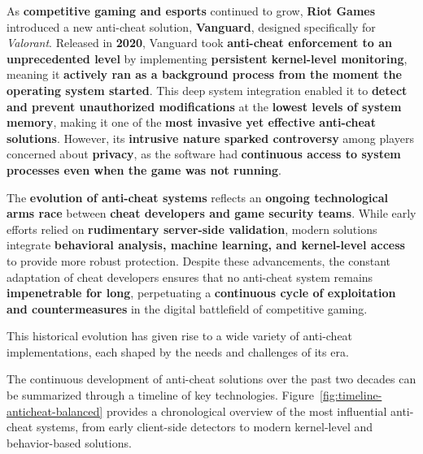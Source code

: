 As \textbf{competitive gaming and esports} continued to grow, \textbf{Riot Games} introduced a new anti-cheat solution, \textbf{Vanguard}, designed specifically for \textit{Valorant}. Released in \textbf{2020}, Vanguard took \textbf{anti-cheat enforcement to an unprecedented level} by implementing \textbf{persistent kernel-level monitoring}, meaning it \textbf{actively ran as a background process from the moment the operating system started}. This deep system integration enabled it to \textbf{detect and prevent unauthorized modifications} at the \textbf{lowest levels of system memory}, making it one of the \textbf{most invasive yet effective anti-cheat solutions}. However, its \textbf{intrusive nature sparked controversy} among players concerned about \textbf{privacy}, as the software had \textbf{continuous access to system processes even when the game was not running}.

The \textbf{evolution of anti-cheat systems} reflects an \textbf{ongoing technological arms race} between \textbf{cheat developers and game security teams}. While early efforts relied on \textbf{rudimentary server-side validation}, modern solutions integrate \textbf{behavioral analysis, machine learning, and kernel-level access} to provide more robust protection. Despite these advancements, the constant adaptation of cheat developers ensures that no anti-cheat system remains \textbf{impenetrable for long}, perpetuating a \textbf{continuous cycle of exploitation and countermeasures} in the digital battlefield of competitive gaming.

This historical evolution has given rise to a wide variety of anti-cheat implementations, each shaped by the needs and challenges of its era.

The continuous development of anti-cheat solutions over the past two decades can be summarized through a timeline of key technologies. Figure~\ref{fig:timeline-anticheat-balanced} provides a chronological overview of the most influential anti-cheat systems, from early client-side detectors to modern kernel-level and behavior-based solutions.

